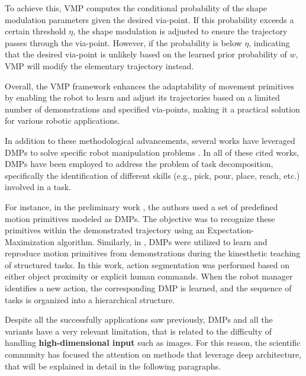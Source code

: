 To achieve this, VMP computes the conditional probability of the shape modulation parameters given the desired via-point. If this probability exceeds a certain threshold \( \eta \), the shape modulation is adjusted to ensure the trajectory passes through the via-point. However, if the probability is below \( \eta \), indicating that the desired via-point is unlikely based on the learned prior probability of \( w \), VMP will modify the elementary trajectory instead.

Overall, the VMP framework enhances the adaptability of movement primitives by enabling the robot to learn and adjust its trajectories based on a limited number of demonstrations and specified via-points, making it a practical solution for various robotic applications.

In addition to these methodological advancements, several works have leveraged DMPs to solve specific robot manipulation problems \cite{meier2011movement_primitive,caccavale2019kinesthetic,agostini2020manipulation}. In all of these cited works, DMPs have been employed to address the problem of task decomposition, specifically the identification of different skills (e.g., pick, pour, place, reach, etc.) involved in a task. 

For instance, in the preliminary work \cite{meier2011movement_primitive}, the authors used a set of predefined motion primitives modeled as DMPs. The objective was to recognize these primitives within the demonstrated trajectory using an Expectation-Maximization algorithm. Similarly, in \cite{caccavale2019kinesthetic}, DMPs were utilized to learn and reproduce motion primitives from demonstrations during the kinesthetic teaching of structured tasks. In this work, action segmentation was performed based on either object proximity or explicit human commands. When the robot manager identifies a new action, the corresponding DMP is learned, and the sequence of tasks is organized into a hierarchical structure.

Despite all the successfully applications saw previously, DMPs and all the variants have a very relevant limitation, that is related to the difficulty of handling \textbf{high-dimensional input} such as images. For this reason, the scientific community has focused the attention on methods that leverage deep architecture, that will be explained in detail in the following paragraphs.



% 
% 